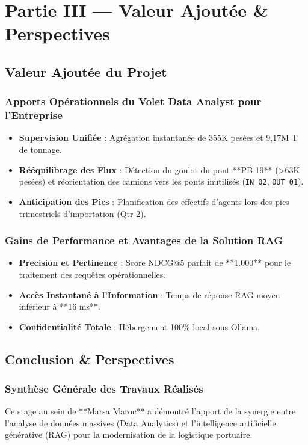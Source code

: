 \documentclass[12pt,a4paper,oneside]{report}
\begin{document}
\chapter{Partie III — Valeur Ajoutée \& Perspectives}

\section{Valeur Ajoutée du Projet}

\subsection{Apports Opérationnels du Volet Data Analyst pour l'Entreprise}
\begin{itemize}
    \item \textbf{Supervision Unifiée} : Agrégation instantanée de 355K pesées et 9,17M T de tonnage.
    \item \textbf{Rééquilibrage des Flux} : Détection du goulot du pont **PB 19** (>63K pesées) et réorientation des camions vers les ponts inutilisés (\texttt{IN 02}, \texttt{OUT 01}).
    \item \textbf{Anticipation des Pics} : Planification des effectifs d'agents lors des pics trimestriels d'importation (Qtr 2).
\end{itemize}

\subsection{Gains de Performance et Avantages de la Solution RAG}
\begin{itemize}
    \item \textbf{Precision et Pertinence} : Score NDCG@5 parfait de **1.000** pour le traitement des requêtes opérationnelles.
    \item \textbf{Accès Instantané à l'Information} : Temps de réponse RAG moyen inférieur à **16 ms**.
    \item \textbf{Confidentialité Totale} : Hébergement 100\% local sous Ollama.
\end{itemize}

\section{Conclusion \& Perspectives}

\subsection{Synthèse Générale des Travaux Réalisés}
Ce stage au sein de **Marsa Maroc** a démontré l'apport de la synergie entre l'analyse de données massives (Data Analytics) et l'intelligence artificielle générative (RAG) pour la modernisation de la logistique portuaire.
\end{document}
